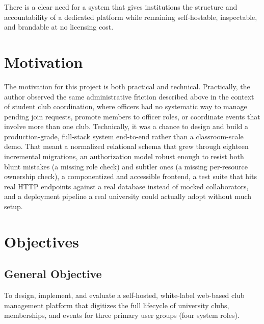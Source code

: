 \documentclass[12pt,oneside]{book}
\begin{document}
There is a clear need for a system that gives institutions the structure and accountability of a dedicated platform while remaining self-hostable, inspectable, and brandable at no licensing cost.

\section{Motivation}

The motivation for this project is both practical and technical. Practically, the author observed the same administrative friction described above in the context of student club coordination, where officers had no systematic way to manage pending join requests, promote members to officer roles, or coordinate events that involve more than one club. Technically, it was a chance to design and build a production-grade, full-stack system end-to-end rather than a classroom-scale demo. That meant a normalized relational schema that grew through eighteen incremental migrations, an authorization model robust enough to resist both blunt mistakes (a missing role check) and subtler ones (a missing per-resource ownership check), a componentized and accessible frontend, a test suite that hits real HTTP endpoints against a real database instead of mocked collaborators, and a deployment pipeline a real university could actually adopt without much setup.

\section{Objectives}

\subsection{General Objective}
To design, implement, and evaluate a self-hosted, white-label web-based club management platform that digitizes the full lifecycle of university clubs, memberships, and events for three primary user groups (four system roles).
\end{document}
